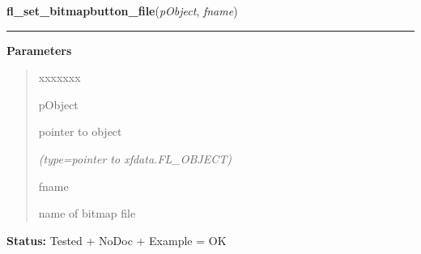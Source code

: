 \hspace{.8\funcindent}\begin{boxedminipage}{\funcwidth}

    \raggedright \textbf{fl\_set\_bitmapbutton\_file}(\textit{pObject}, \textit{fname})

    \vspace{-1.5ex}

    \rule{\textwidth}{0.5\fboxrule}
\setlength{\parskip}{2ex}
\setlength{\parskip}{1ex}
      \textbf{Parameters}
      \vspace{-1ex}

      \begin{quote}
        \begin{Ventry}{xxxxxxx}

          \item[pObject]

          pointer to object

            {\it (type=pointer to xfdata.FL\_OBJECT)}

          \item[fname]

          name of bitmap file

        \end{Ventry}

      \end{quote}

\textbf{Status:} Tested + NoDoc + Example = OK



    \end{boxedminipage}

    \label{xformslib:library:fl_set_bitmap_file}

    \vspace{0.5ex}

